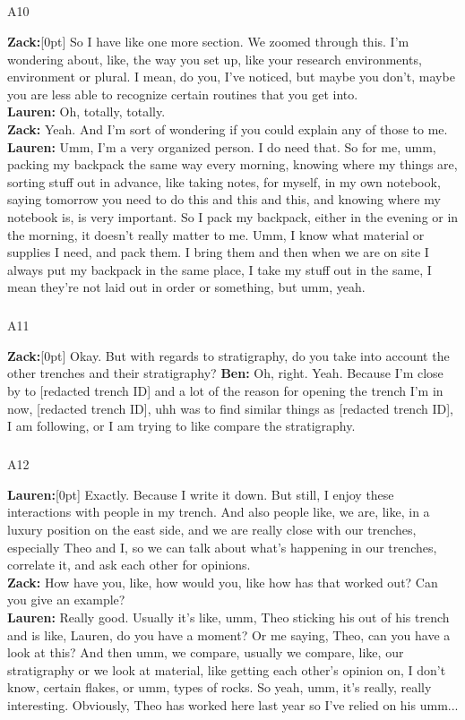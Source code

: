 \documentclass[
]{article}
\makeatletter
\let\oldsubparagraph\subparagraph
\renewcommand{\subparagraph}{
    \@ifstar
      \xxxSubParagraphStar
      \xxxSubParagraphNoStar
  }
\newcommand{\xxxSubParagraphStar}[1]{\oldsubparagraph*{#1}\mbox{}}
\newcommand{\xxxSubParagraphNoStar}[1]{\oldsubparagraph{#1}\mbox{}}
\newcommand{\paragraphnumber}[1]{\marginnote{\color{lightgray}\tiny{#1}}[0pt]}
\makeatother
\begin{document}
\subparagraph{A10}\label{sec-A10}

\textbf{Zack:}\paragraphnumber{[61]} So I have like one more section. We
zoomed through this. I'm wondering about, like, the way you set up, like
your research environments, environment or plural. I mean, do you, I've
noticed, but maybe you don't, maybe you are less able to recognize
certain routines that you get into.\\
\textbf{Lauren:} Oh, totally, totally.\\
\textbf{Zack:} Yeah. And I'm sort of wondering if you could explain any
of those to me.\\
\textbf{Lauren:} Umm, I'm a very organized person. I do need that. So
for me, umm, packing my backpack the same way every morning, knowing
where my things are, sorting stuff out in advance, like taking notes,
for myself, in my own notebook, saying tomorrow you need to do this and
this and this, and knowing where my notebook is, is very important. So I
pack my backpack, either in the evening or in the morning, it doesn't
really matter to me. Umm, I know what material or supplies I need, and
pack them. I bring them and then when we are on site I always put my
backpack in the same place, I take my stuff out in the same, I mean
they're not laid out in order or something, but umm, yeah.

\subparagraph{A11}\label{sec-A11}

\textbf{Zack:}\paragraphnumber{[62]} Okay. But with regards to
stratigraphy, do you take into account the other trenches and their
stratigraphy? \textbf{Ben:} Oh, right. Yeah. Because I'm close by to
{[}redacted trench ID{]} and a lot of the reason for opening the trench
I'm in now, {[}redacted trench ID{]}, uhh was to find similar things as
{[}redacted trench ID{]}, I am following, or I am trying to like compare
the stratigraphy.

\subparagraph{A12}\label{sec-A12}

\textbf{Lauren:}\paragraphnumber{[63]} Exactly. Because I write it down.
But still, I enjoy these interactions with people in my trench. And also
people like, we are, like, in a luxury position on the east side, and we
are really close with our trenches, especially Theo and I, so we can
talk about what's happening in our trenches, correlate it, and ask each
other for opinions.\\
\textbf{Zack:} How have you, like, how would you, like how has that
worked out? Can you give an example?\\
\textbf{Lauren:} Really good. Usually it's like, umm, Theo sticking his
out of his trench and is like, Lauren, do you have a moment? Or me
saying, Theo, can you have a look at this? And then umm, we compare,
usually we compare, like, our stratigraphy or we look at material, like
getting each other's opinion on, I don't know, certain flakes, or umm,
types of rocks. So yeah, umm, it's really, really interesting.
Obviously, Theo has worked here last year so I've relied on his umm...
\end{document}
